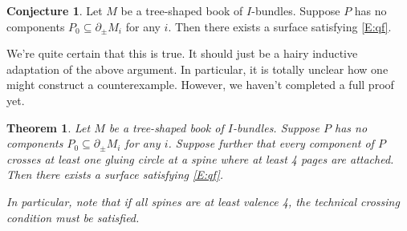 \documentclass[12pt]{amsart}
\newtheorem{thm}[theorem]{Theorem}
\theoremstyle{definition}
\newtheorem{conj}[theorem]{Conjecture}
\theoremstyle{remark}
\newcommand{\bd}{\partial}
\newcommand{\cin}{\subseteq}
\begin{document}
\begin{conj}

Let $M$ be a tree-shaped book of $I$-bundles. Suppose $P$ has no components
$P_0\cin \bd_\pm M_i$ for any $i$. Then there exists a surface satisfying
\eqref{E:qf}.

\end{conj}

We're quite certain that this is true. It should just be a hairy inductive
adaptation of the above argument. In particular, it is totally unclear how one
might construct a counterexample. However, we haven't completed a full proof
yet.

\begin{thm}

Let $M$ be a tree-shaped book of $I$-bundles. Suppose $P$ has no components
$P_0 \cin \bd_\pm M_i$ for any $i$. Suppose further that every
component of $P$ crosses at least one gluing circle at a spine where at least
4 pages are attached. Then there exists a surface satisfying \eqref{E:qf}.

In particular, note that if all spines are at least valence 4, the technical
crossing condition must be satisfied.

\end{thm}
\end{document}
